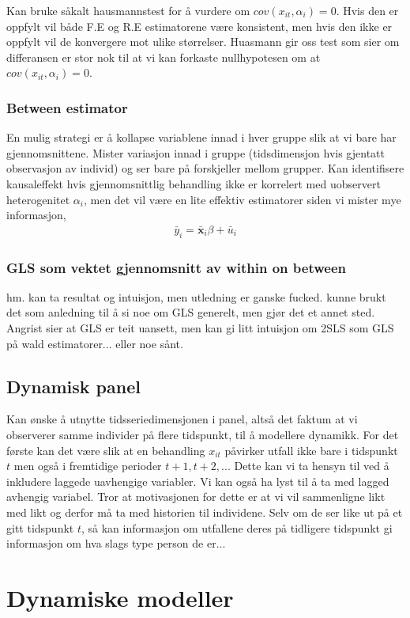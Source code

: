 Kan bruke såkalt hausmannstest for å vurdere om $cov(x_{it},\alpha_i)=0$. Hvis den er oppfylt vil både F.E og R.E estimatorene være konsistent, men hvis den ikke er oppfylt vil de konvergere mot ulike størrelser. Huasmann gir oss test som sier om differansen er stor nok til at vi kan forkaste nullhypotesen om at $cov(x_{it},\alpha_i)=0$. 

\subsubsection{Between estimator}
En mulig strategi er å kollapse variablene innad i hver gruppe slik at vi bare har gjennomsnittene. Mister variasjon innad i gruppe (tidsdimensjon hvis gjentatt observasjon av individ) og ser bare på forskjeller mellom grupper. Kan identifisere kausaleffekt hvis gjennomsnittlig behandling ikke er korrelert med uobservert heterogenitet $\alpha_i$, men det vil være en lite effektiv estimatorer siden vi mister mye informasjon,
\begin{align}
\bar{y}_i = \bar{\mathbf{x}}_i\beta + \bar{u}_i
\end{align}
\subsubsection{GLS som vektet gjennomsnitt av within on between}
hm. kan ta resultat og intuisjon, men utledning er ganske fucked. kunne brukt det som anledning til å si noe om GLS generelt, men gjør det et annet sted. Angrist sier at GLS er teit uansett, men kan gi litt intuisjon om 2SLS som GLS på wald estimatorer... eller noe sånt.
\subsection{Dynamisk panel}
Kan ønske å utnytte tidsseriedimensjonen i panel, altså det faktum at vi observerer samme individer på flere tidspunkt, til å modellere dynamikk. For det første kan det være slik at en behandling $x_{it}$ påvirker utfall ikke bare i tidspunkt $t$ men også i fremtidige perioder $t+1,t+2,..$. Dette kan vi ta hensyn til ved å inkludere laggede uavhengige variabler. Vi kan også ha lyst til å ta med lagged avhengig variabel. Tror at motivasjonen for dette er at vi vil sammenligne likt med likt og derfor må ta med historien til individene. Selv om de ser like ut på et gitt tidspunkt $t$, så kan informasjon om utfallene deres på tidligere tidspunkt gi informasjon om hva slags type person de er...
\section{Dynamiske modeller}

